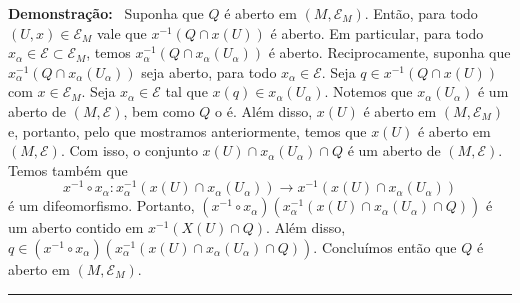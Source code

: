 \documentclass[12pt]{report}
\newenvironment{dem}[1][Demonstração]{\textbf{#1:}\ }  {\hfill\rule{1ex}{1ex}}
\newcommand{\oo}{_}
\newcommand{\inv}[1]{\ensuremath{{#1}^{-1}}}
\begin{document}
\begin{dem}
    Suponha que $Q$ é aberto em $(M, \mathcal{E} \oo M)$. 
    Então, para todo $(U , x)\in \mathcal{E} \oo M$ vale que $ \inv{x} (Q \cap x(U)) $ é aberto. 
    Em particular, para todo $x \oo \alpha \in \mathcal{E} \subset  \mathcal{E} \oo M$, temos $x \oo \alpha^{-1} (Q \cap x \oo \alpha (U \oo \alpha ))$ é aberto. 
    Reciprocamente, suponha que $x\oo \alpha ^{-1} (Q \cap x \oo \alpha (U \oo \alpha) )$ seja aberto, para todo $x \oo \alpha \in \mathcal{E}$. 
    Seja $q  \in x  ^{-1} (Q \cap x (U ) ) $ com $x \in \mathcal{E}\oo M$. 
    Seja $x \oo \alpha \in \mathcal{E}$ tal que $x(q) \in x \oo \alpha (U \oo \alpha )$. 
    Notemos que $x_{\alpha} (U _\alpha)$ é um aberto de $(M, \mathcal{E})$, bem como $Q$ o é. 
    Além disso, $x (U)$ é aberto em $(M, \mathcal{E} _M)$ e, portanto, pelo que mostramos anteriormente, temos que $x(U)$ é aberto em $(M, \mathcal{E})$. 
    Com isso, o conjunto $x(U) \cap x _ \alpha (U _\alpha) \cap Q$ é um aberto de $(M, \mathcal{E})$. 
    Temos também que 
    $$
        x ^{-1} \circ x _\alpha : x_ \alpha ^{-1} (x(U) \cap x_ \alpha (U_\alpha)) \rightarrow x^{-1} (x(U) \cap x_ \alpha (U_\alpha)) 
    $$
    é um difeomorfismo. 
    Portanto, $( x ^{-1} \circ x _\alpha) (x _{\alpha}^{-1} (x(U) \cap x_ \alpha (U_\alpha) \cap Q))$ é um aberto contido em $x^{-1 } (X(U) \cap Q)$. 
    Além disso, $q \in (x ^{-1} \circ x _\alpha )(x _\alpha ^{-1} (x(U) \cap x_ \alpha (U_\alpha) \cap Q))$. 
    Concluímos então que $Q$ é aberto em $(M, \mathcal{E}_M)$.
    
\end{dem}
\end{document}
